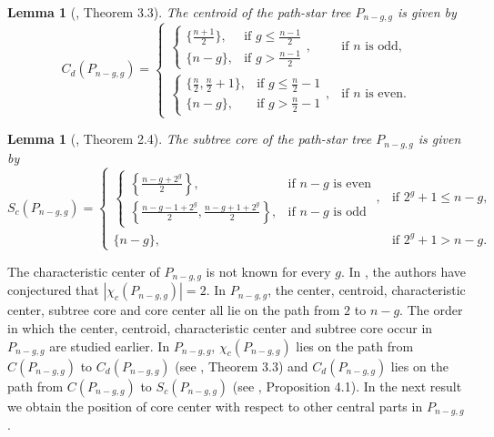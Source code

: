 \documentclass[10pt,a4paper]{amsart}
\newtheorem{lemma}[theorem]{Lemma}
\begin{document}
\begin{lemma}[\cite{Des}, Theorem 3.3]\label{lem2.3}
The centroid of the path-star tree $P_{n - g, g}$ is given by
\begin{equation*}
C_d(P_{n - g, g}) =
\begin{cases}
\begin{cases}
\{\frac{n + 1}{2}\}, &\text{if $g \leq \frac{n - 1}{2}$}\\
\{n - g\}, &\text{if $g > \frac{n - 1}{2}$}
\end{cases}, &\text{if $n$ is odd,}\\
\begin{cases}
\{\frac{n}{2}, \frac{n}{2} + 1\}, &\text{if $g \leq \frac{n}{2} - 1$}\\
\{n - g\}, &\text{if $g > \frac{n}{2} - 1$}
\end{cases}, &\text{if $n$ is even.}
\end{cases}
\end{equation*}
\end{lemma}

\begin{lemma}[\cite{Des}, Theorem 2.4]\label{lem2.4}
The subtree core of the path-star tree $P_{n-g, g}$ is given by
\begin{equation*}
S_c(P_{n-g, g}) =
\begin{cases}
\begin{cases}
\left\{\frac{n - g + 2^g}{2}\right\}, &\text{if $n - g$ is even}\\
\left\{\frac{n - g - 1 + 2^g}{2}, \frac{n - g + 1 + 2^g}{2}\right\} , &\text{if $n - g$ is odd}
\end{cases}, &\text{if $2^g + 1 \leq n - g$,}\\
\{n - g\}, &\text{if $2^g + 1 > n - g.$}
\end{cases}
\end{equation*}
\end{lemma}

The  characteristic center of $P_{n-g,g}$ is not known for every $g$. In \cite{Pandey2}, the authors have conjectured that 
$|\chi_c(P_{n-g,g})|=2$. In $P_{n-g,g}$, the center, centroid, characteristic center, subtree core and core center  all lie on the path from $2$ to $n-g$. The order in which the center, centroid, characteristic center and  subtree core occur in $P_{n-g,g}$ are studied earlier. In $P_{n-g,g}$, $\chi_c(P_{n-g,g})$ lies on the path from $C(P_{n-g,g})$ to $C_d(P_{n-g,g})$ (see \cite{Klp}, Theorem 3.3) and $C_d(P_{n-g,g})$ lies on the path from $C(P_{n-g,g})$ to $S_c(P_{n-g,g})$ (see \cite{Des}, Proposition 4.1). In the next result we obtain the  position of core center with respect to other central parts in $P_{n-g,g}$.
\end{document}
